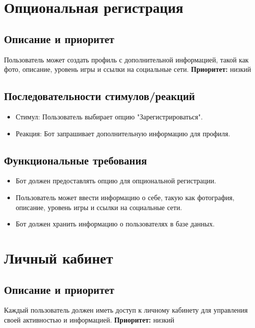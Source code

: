 \documentclass{scrreprt}
\begin{document}
\section{Опциональная регистрация}

\subsection{Описание и приоритет}
Пользователь может создать профиль с дополнительной информацией, такой как фото, описание, уровень игры и ссылки на социальные сети.
\newline
\textbf{Приоритет:} низкий

\subsection{Последовательности стимулов/реакций}
\begin{itemize}
    \item Стимул: Пользователь выбирает опцию "Зарегистрироваться".
    \item Реакция: Бот запрашивает дополнительную информацию для профиля.
\end{itemize}

\subsection{Функциональные требования}
\begin{itemize}
    \item Бот должен предоставлять опцию для опциональной регистрации.
    \item Пользователь может ввести информацию о себе, такую как фотография, описание, уровень игры и ссылки на социальные сети.
    \item Бот должен хранить информацию о пользователях в базе данных.
\end{itemize}

\section{Личный кабинет}

\subsection{Описание и приоритет}
Каждый пользователь должен иметь доступ к личному кабинету для управления своей активностью и информацией.
\newline
\textbf{Приоритет:} низкий
\end{document}
